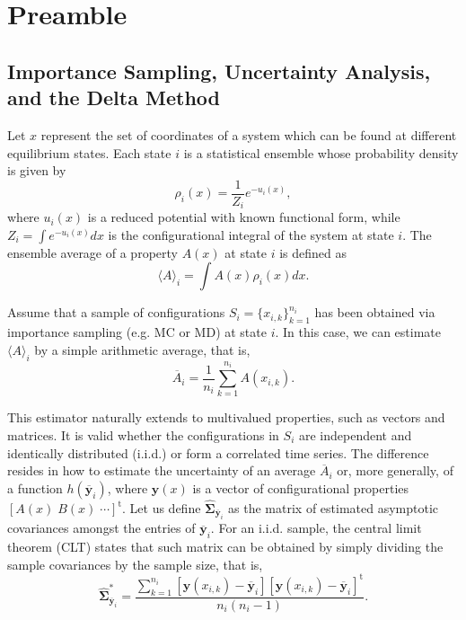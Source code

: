 \documentclass[
    journal=jctcce,
    layout=twocolumn
]{achemso}
\newcommand{\mt}[1]{\boldsymbol{\mathbf{#1}}}   %
\newcommand{\vt}[1]{\boldsymbol{\mathbf{#1}}}   %
\newcommand{\tr}[1]{#1^\text{t}}                %
\newcommand{\avg}[1]{\overline{#1}}             %
\begin{document}
\section{Preamble}

\subsection{Importance Sampling, Uncertainty Analysis, and the Delta Method}
\label{sec:definitions}

Let $x$ represent the set of coordinates of a system which can be found at different equilibrium states. Each state $i$ is a statistical ensemble whose probability density is given by
\begin{equation}
\label{eq:state_prob_density}
\rho_i(x) = \frac{1}{Z_i} e^{-u_i(x)},
\end{equation}
where $u_i(x)$ is a reduced potential \cite{Shirts_2008, Chodera_2011_2} with known functional form, while $Z_i = \int e^{-u_i(x)}dx$ is the configurational integral of the system at state $i$. The ensemble average of a property $A(x)$ at state $i$ is defined as
\begin{equation}
\label{eq:ensemble average}
\langle A \rangle_i = \int A(x)\rho_i(x)dx.
\end{equation}

Assume that a sample of configurations $S_i = \{x_{i,k}\}_{k=1}^{n_i}$ has been obtained via importance sampling \cite{Allen_1987} (e.g. MC or MD) at state $i$. In this case, we can estimate $\langle A \rangle_i$ by a simple arithmetic average, that is,
\begin{equation}
\label{eq:average estimator}
\avg A_i = \frac{1}{n_i} \sum_{k=1}^{n_i} A(x_{i,k}).
\end{equation}

This estimator naturally extends to multivalued properties, such as vectors and matrices. It is valid whether the configurations in $S_i$ are independent and identically distributed (i.i.d.) or form a correlated time series. The difference resides in how to estimate the uncertainty of an average $\avg A_i$ or, more generally, of a function $h(\avg {\vt y}_i)$, where $\vt y(x)$ is a vector of configurational properties $\tr{[A(x) \; B(x) \; \cdots]}$. Let us define $\hat{\mt \Sigma}_{\avg{\vt y}_i}$ as the matrix of estimated asymptotic covariances amongst the entries of $\avg{\vt y}_i$. For an i.i.d. sample, the central limit theorem (CLT) states that such matrix can be obtained by simply dividing the sample covariances by the sample size, that is,
\begin{equation}
\label{eq:asymptotic covariance IID}
\hat{\mt \Sigma}^{\ast}_{\avg{\vt y}_i} = \frac{\sum\limits_{k=1}^{n_i} \left[\vt y(x_{i,k}) - \avg{\vt y}_i\right] \tr{\left[\vt y(x_{i,k}) - \avg{\vt y}_i\right]}}{n_i(n_i - 1)}.
\end{equation}
\end{document}
